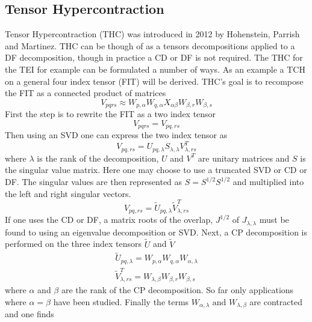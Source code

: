 	\subsection{Tensor Hypercontraction}
		Tensor Hypercontraction (THC) was introduced in 2012 by Hohenstein, Parrish and Martinez\cite{Schutski2017}. THC can be though of as a tensors decompositions applied to a DF decomposition, though in practice a CD or DF is not required. The THC for the TEI for example can be formulated a number of ways. As an example a TCH on a general four index tensor (FIT) will be derived. THC's goal is to recompose the FIT as a connected product of matrices 
			\begin{equation}
				V_{pqrs} \approx W_{p,\alpha} W_{q,\alpha} X_{\alpha\beta} W_{\beta, r} W_{\beta,s}
			\end{equation}
		First the step is to rewrite the FIT as a two index tensor
			\begin{equation}
				V_{pqrs} = V_{pq,rs}
			\end{equation}
		Then using an SVD one can express the two index tensor as
			\begin{equation}
				V_{pq,rs} = U_{pq,\lambda}S_{\lambda,\lambda} V^T_{\lambda, rs}
			\end{equation}
		where $\lambda$ is the rank of the decomposition, $U$ and $V^T$ are unitary matrices and $S$ is the singular value matrix. Here one may choose to use a truncated SVD or CD or DF. The singular values are then represented as $S = S^{1/2} S^{1/2}$ and multiplied into the left and right singular vectors.
			\begin{equation}
				V_{pq,rs} = \tilde{U}_{pq, \lambda} \tilde{V}^T_{\lambda,rs}
			\end{equation}
		If one uses the CD or DF, a matrix roots of the overlap, $J^{1/2}$ of $J_{\lambda,\lambda}$ must be found to using an eigenvalue decomposition or SVD. Next, a CP decomposition is performed on the three index tensors $\tilde{U}$ and $\tilde{V}$
			\begin{equation}
				\begin{aligned}
					\tilde{U}_{pq, \lambda} = W_{p,\alpha} W_{q, \alpha} W_{\alpha, \lambda}\\
					\tilde{V}^T_{\lambda,rs} = W_{\lambda, \beta} W_{\beta, r} W_{\beta, s}
				\end{aligned}
			\end{equation}
		where $\alpha$ and $\beta$ are the rank of the CP decomposition. So far only applications where $\alpha = \beta$ have been studied. Finally the terms $W_{\alpha, \lambda} \text{ and } W_{\lambda, \beta}$ are contracted and one finds
